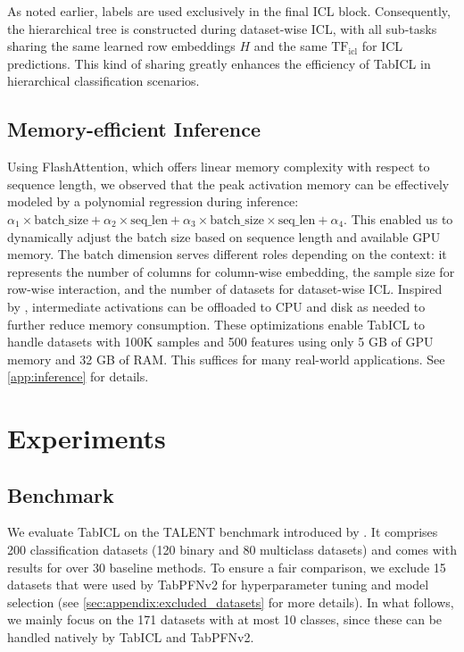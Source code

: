 \documentclass{article}
\theoremstyle{plain}
\theoremstyle{definition}
\theoremstyle{remark}
\newcommand{\TFicl}{\text{TF}_{\text{icl}}}
\begin{document}
As noted earlier, labels are used exclusively in the final ICL block. Consequently, the hierarchical tree is constructed during dataset-wise ICL, with all sub-tasks sharing the same learned row embeddings $H$ and the same $\TFicl$ for ICL predictions. This kind of sharing greatly enhances the efficiency of TabICL in hierarchical classification scenarios.

\subsection{Memory-efficient Inference}

Using FlashAttention, which offers linear memory complexity with respect to sequence length, we observed that the peak activation memory can be effectively modeled by a polynomial regression during inference: \( \alpha_1 \times \text{batch\_size} + \alpha_2 \times \text{seq\_len} + \alpha_3 \times \text{batch\_size} \times \text{seq\_len} + \alpha_4 \). This enabled us to dynamically adjust the batch size based on sequence length and available GPU memory. 
The batch dimension serves different roles depending on the context: it represents the number of columns for column-wise embedding, the sample size for row-wise interaction, and the number of datasets for dataset-wise ICL.
Inspired by \citet{rajbhandariZeROInfinityBreakingGPU2021}, intermediate activations can be offloaded to CPU and disk as needed to further reduce memory consumption. These optimizations enable TabICL to handle datasets with 100K samples and 500 features using only 5 GB of GPU memory and 32 GB of RAM. This suffices for many real-world applications. See \cref{app:inference} for details.

\section{Experiments}

\subsection{Benchmark}

We evaluate TabICL on the TALENT benchmark introduced by \citet{yeCloserLookDeep2025a}. It comprises 200 classification datasets (120 binary and 80 multiclass datasets) and comes with results for over 30 baseline methods. To ensure a fair comparison, we exclude 15 datasets that were used by TabPFNv2 for hyperparameter tuning and model selection (see \cref{sec:appendix:excluded_datasets} for more details). In what follows, we mainly focus on the 171 datasets with at most 10 classes, since these can be handled natively by TabICL and TabPFNv2.
\end{document}

